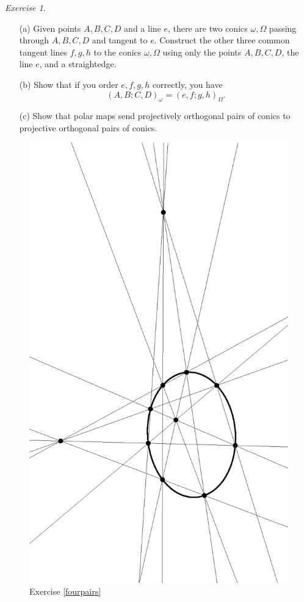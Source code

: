 \documentclass[letterpaper,11pt]{article}
\theoremstyle{definition}
\theoremstyle{remark}
\newtheorem{exer}{Exercise}
\begin{document}
\begin{exer}\label{conictangents}
\begin{itemize}
\item[(a)] Given points $A,B,C,D$ and a line $e$, there are two conics $\omega,\Omega$ passing through $A,B,C,D$ and tangent to $e$. Construct the other three common tangent lines $f,g,h$ to the conics $\omega,\Omega$ using only the points $A,B,C,D$, the line $e$, and a straightedge.

\item[(b)] Show that if you order $e,f,g,h$ correctly, you have
\[
(A,B;C,D)_\omega = (e,f;g,h)_\Omega.
\]

\item[(c)] Show that polar maps send projectively orthogonal pairs of conics to projective orthogonal pairs of conics.
\end{itemize}
\end{exer}

\begin{figure}[!htb]
\centering
\includegraphics[scale=0.5,angle=270]{fourpairs.eps}
\caption{Exercise \ref{fourpairs}}
\end{figure}
\end{document}
